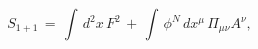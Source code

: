 \begin{equation}
\label{gau1}
S_{1+1} \, = \, \int\, d^2x \, F^2 \, + \, \int \,
\phi^N \, dx^{\mu}\, \Pi_{\mu\nu} A^{\nu},
\end{equation}

